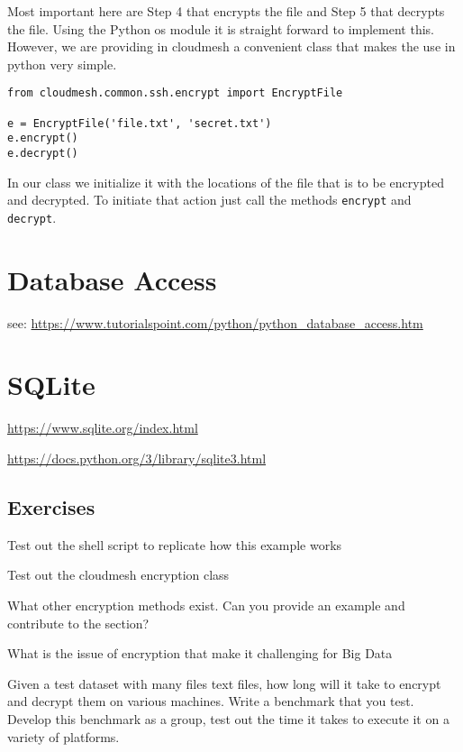 Most important here are Step 4 that encrypts the file and Step 5 that
decrypts the file. Using the Python os module it is straight forward
to implement this. However, we are providing in cloudmesh a convenient
class that makes the use in python very simple.

\begin{verbatim}
from cloudmesh.common.ssh.encrypt import EncryptFile

e = EncryptFile('file.txt', 'secret.txt')
e.encrypt()
e.decrypt()
\end{verbatim}

In our class we initialize it with the locations of the file that is
to be encrypted and decrypted. To initiate that action just call the
methods \verb|encrypt| and \verb|decrypt|.

\section{Database Access}\label{database-access}


see: \url{https://www.tutorialspoint.com/python/python_database_access.htm}

\section{SQLite}


\url{https://www.sqlite.org/index.html}

\url{https://docs.python.org/3/library/sqlite3.html}

\subsection{Exercises}

\begin{exercise}\label{E:Encryption.1} 
Test out the shell script to replicate how this
  example works
\end{exercise}

\begin{exercise}\label{E:Encryption.2} 
Test out the cloudmesh encryption class
\end{exercise}

\begin{exercise}\label{E:Encryption.3} 
What other encryption methods exist. Can you
  provide an example and contribute to the section?
\end{exercise}

\begin{exercise}\label{E:Encryption.4} 
What is the issue of encryption that make it
  challenging for Big Data
\end{exercise}

\begin{exercise}\label{E:Encryption.5} 
Given a test dataset with many files text
  files, how long will it take to encrypt and decrypt them on various
  machines. Write a benchmark that you test. Develop this benchmark as
  a group, test out the time it takes to execute it on a variety of
  platforms.
\end{exercise}
